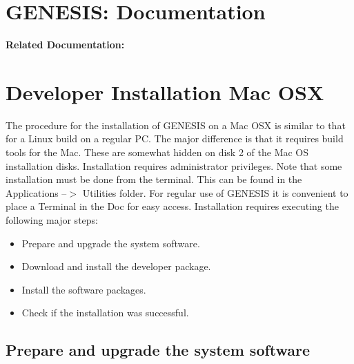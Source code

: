 \documentclass[12pt]{article}
\begin{document}
\section*{GENESIS: Documentation}

{\bf Related Documentation:}

\section*{Developer Installation Mac OSX}

The procedure for the installation of GENESIS on a Mac OSX is similar to that for a Linux build on a regular PC. The major difference is that it requires build tools for the Mac. These are somewhat hidden on disk 2 of the Mac OS installation disks. Installation requires administrator privileges. Note that  some installation must be done from the terminal. This can be found in the Applications --$>$ Utilities folder. For regular use of GENESIS it is convenient to place a Terminal in the Doc for easy access.
Installation requires executing the following major steps:
\begin{itemize}
   \item[] Prepare and upgrade the system software.
   \item[] Download and install the developer package.
   \item[] Install the software packages.
   \item[] Check if the installation was successful. 
\end{itemize}

\subsection*{Prepare and upgrade the system software}
\end{document}
